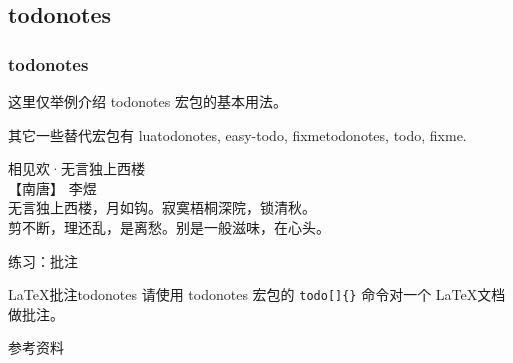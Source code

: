 \documentclass[final]{ctexbeamer}
\begin{document}
\subsection{todonotes}
\begin{frame}[fragile]
\frametitle{todonotes}
这里仅举例介绍 todonotes 宏包的基本用法。

其它一些替代宏包有 luatodonotes, easy-todo, fixmetodonotes, todo, fixme.
\end{frame}


\begin{frame}[fragile]
\begin{vertlst}
\centering
相见欢·无言独上西楼 \\
【南唐】 李煜 \\
无言独上西楼，月如钩。寂寞梧桐深院，锁清秋。 \\
剪不断，理还乱，是离愁。别是一般滋味，在心头。
\end{vertlst}
\end{frame}


\begin{frame}[fragile]
\begin{vertlst}
\end{vertlst}
\end{frame}


\begin{frame}[fragile]{练习：批注}
\begin{Ex}{\LaTeX 批注}{todonotes}
请使用 todonotes 宏包的 \verb+todo[]{}+ 命令对一个 \LaTeX 文档做批注。
\end{Ex}
\end{frame}


\begin{frame}[allowframebreaks]{参考资料}
\printbibliography[heading=none]
\end{frame}
\end{document}
